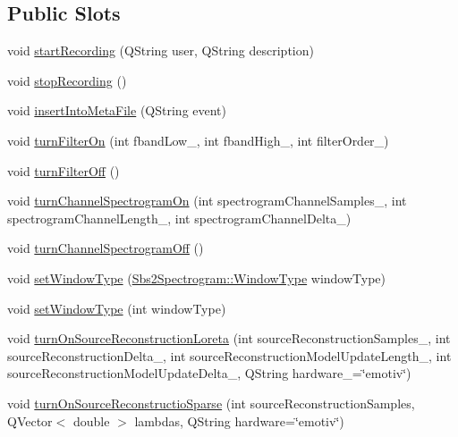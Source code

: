 \subsection*{Public Slots}
\begin{DoxyCompactItemize}
\item 
void \hyperlink{classSbs2Callback_a7d5a8d24240c64c58d79be03d990526b}{start\-Recording} (Q\-String user, Q\-String description)
\item 
void \hyperlink{classSbs2Callback_a62cf46e7415db4cafd2dad2d0b821a42}{stop\-Recording} ()
\item 
void \hyperlink{classSbs2Callback_a18e265de74d9a4e46a0ec3b1b4064a39}{insert\-Into\-Meta\-File} (Q\-String event)
\item 
void \hyperlink{classSbs2Callback_a398880b41625e91557827f3375cfc835}{turn\-Filter\-On} (int fband\-Low\-\_\-, int fband\-High\-\_\-, int filter\-Order\-\_\-)
\item 
void \hyperlink{classSbs2Callback_a0887db578eeafa6056ab8a5ae413ff16}{turn\-Filter\-Off} ()
\item 
void \hyperlink{classSbs2Callback_a3cb61e2d70abbf73d546a8329863b331}{turn\-Channel\-Spectrogram\-On} (int spectrogram\-Channel\-Samples\-\_, int spectrogram\-Channel\-Length\-\_, int spectrogram\-Channel\-Delta\-\_)
\item 
void \hyperlink{classSbs2Callback_a7a05a0cca91ec4ac82387f7813f8dce0}{turn\-Channel\-Spectrogram\-Off} ()
\item 
void \hyperlink{classSbs2Callback_a4120c9ad061934c2c3ba9e12fad19fa3}{set\-Window\-Type} (\hyperlink{classSbs2Spectrogram_a22265347883488b8385c83b67882d915}{Sbs2\-Spectrogram\-::\-Window\-Type} window\-Type)
\item 
void \hyperlink{classSbs2Callback_a503b955e5f769de0441c03aca7119d39}{set\-Window\-Type} (int window\-Type)
\item 
void \hyperlink{classSbs2Callback_a9a7e91c47226e2110c5592f3216c8ec4}{turn\-On\-Source\-Reconstruction\-Loreta} (int source\-Reconstruction\-Samples\-\_\-, int source\-Reconstruction\-Delta\-\_\-, int source\-Reconstruction\-Model\-Update\-Length\-\_\-, int source\-Reconstruction\-Model\-Update\-Delta\-\_\-, Q\-String hardware\-\_\-=\char`\"{}emotiv\char`\"{})
\item 
void \hyperlink{classSbs2Callback_a1dc541c041e8ec86c4e2c11aed3dc137}{turn\-On\-Source\-Reconstructio\-Sparse} (int source\-Reconstruction\-Samples, Q\-Vector$<$ double $>$ lambdas, Q\-String hardware=\char`\"{}emotiv\char`\"{})
\item 

\end{DoxyCompactItemize}
